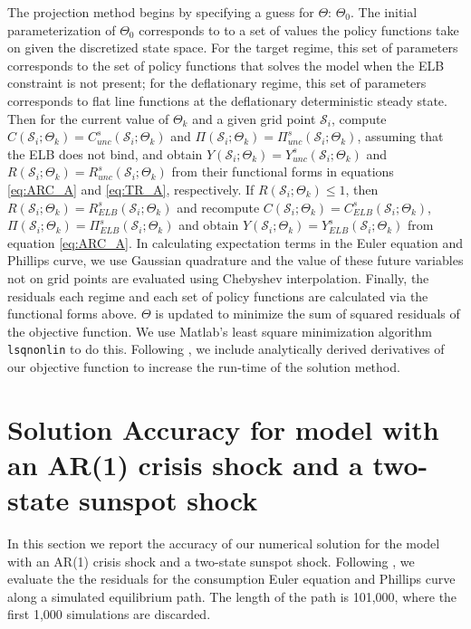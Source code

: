 \documentclass[11pt]{article}
\begin{document}
\begin{singlespace}
	The projection method begins by specifying a guess for $\Theta$: $\Theta_0$. The initial parameterization of $\Theta_0$ corresponds to to a set of values the policy functions take on given the discretized state space. For the target regime, this set of parameters corresponds to the set of policy functions that solves the model when the ELB constraint is not present; for the deflationary regime, this set of parameters corresponds to flat line functions at the deflationary deterministic steady state. Then for the current value of $\Theta_k$ and a given grid point $\mathcal{S}_i$, compute $C(\mathcal{S}_{i};\Theta_{k}) = C_{unc}^s(\mathcal{S}_{i};\Theta_{k})$ and $\Pi(\mathcal{S}_{i};\Theta_{k}) = \Pi_{unc}^s(\mathcal{S}_{i};\Theta_{k})$, assuming that the ELB does not bind, and obtain $Y(\mathcal{S}_{i};\Theta_{k}) = Y_{unc}^s(\mathcal{S}_{i};\Theta_{k})$ and $R(\mathcal{S}_{i};\Theta_{k}) = R_{unc}^s(\mathcal{S}_{i};\Theta_{k})$ from their functional forms in equations \ref{eq:ARC_A} and \ref{eq:TR_A}, respectively. If $R(\mathcal{S}_{i};\Theta_{k})\le 1$, then $R(\mathcal{S}_{i};\Theta_{k}) = R_{ELB}^s(\mathcal{S}_{i};\Theta_{k})$ and recompute $C(\mathcal{S}_{i};\Theta_{k}) = C_{ELB}^s(\mathcal{S}_{i};\Theta_{k})$, $\Pi(\mathcal{S}_{i};\Theta_{k}) = \Pi_{ELB}^s(\mathcal{S}_{i};\Theta_{k})$ and obtain $Y(\mathcal{S}_{i};\Theta_{k}) = Y_{ELB}^s(\mathcal{S}_{i};\Theta_{k})$ from equation \ref{eq:ARC_A}. In calculating expectation terms in the Euler equation and Phillips curve, we use Gaussian quadrature and the value of these future variables not on grid points are evaluated using Chebyshev interpolation. Finally, the residuals each regime and each set of policy functions are calculated via the functional forms above. $\Theta$ is updated to minimize the sum of squared residuals of the objective function. We use Matlab's least square minimization algorithm \texttt{lsqnonlin}  to do this. Following \citet{AruobaCubaBordaSchorfheide2018}, we include analytically derived derivatives of our objective function to increase the run-time of the solution method.  
	
	\section{Solution Accuracy for model with an AR(1) crisis shock and a two-state sunspot shock}
	\label{A:SolutionAccuracy}
	
	In this section we report the accuracy of our numerical solution for the model with an AR(1) crisis shock and a two-state sunspot shock. Following \citet{MaliarMaliar2015}, we evaluate the the residuals for the consumption Euler equation and Phillips curve along a simulated equilibrium path. The length of the path is 101,000, where the first 1,000 simulations are discarded. 
	

\end{singlespace}
\end{document}
